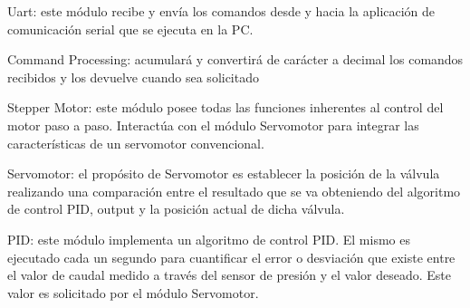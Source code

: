 Uart:  
este módulo recibe y envía los comandos desde y hacia la aplicación de comunicación serial que se ejecuta en la PC.

Command Processing:
acumulará y convertirá de carácter a decimal los comandos recibidos y los devuelve cuando sea solicitado



Stepper Motor:
este módulo posee todas las funciones inherentes al control del motor paso a paso. Interactúa con el módulo Servomotor para integrar las características de un servomotor convencional. 

Servomotor:
el propósito de Servomotor es establecer la posición de la válvula realizando una comparación entre el resultado que se va obteniendo del algoritmo de control PID, output y la posición actual de dicha válvula.

PID:  
este módulo implementa un algoritmo de control PID. El mismo es ejecutado cada un segundo para cuantificar el error o desviación que existe entre el valor de caudal medido a través del sensor de presión y el valor deseado. Este valor es solicitado por el módulo Servomotor.
